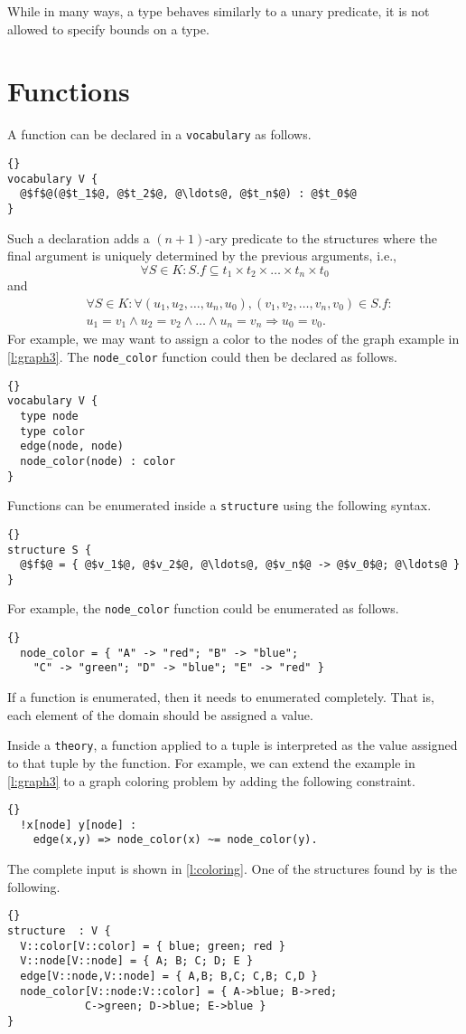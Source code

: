 \documentclass{article}
\begin{document}
While in many ways, a type behaves similarly to a unary predicate,
it is not allowed to specify bounds on a type.

\section{Functions}

A function can be declared in a \texttt{vocabulary} as follows.
\begin{lstlisting}[escapechar=@]{}
vocabulary V {
  @$f$@(@$t_1$@, @$t_2$@, @\ldots@, @$t_n$@) : @$t_0$@
}
\end{lstlisting}
Such a declaration adds a $(n+1)$-ary predicate to the structures
where the final argument is uniquely determined by the previous arguments,
i.e.,
$$
\forall S \in K : S.f \subseteq
	t_1 \times t_2 \times \ldots \times t_n \times t_0
$$
and
$$
\begin{aligned}
& \forall S \in K :
	\forall (u_1, u_2, \ldots, u_n, u_0),
	(v_1, v_2, \ldots, v_n, v_0) \in S.f: \\
&	u_1 = v_1 \wedge u_2 = v_2 \wedge \ldots \wedge u_n = v_n
	\Rightarrow u_0 = v_0
.
\end{aligned}
$$
For example, we may want to assign a color to the nodes
of the graph example in \autoref{l:graph3}.  The \texttt{node\_color}
function could then be declared as follows.
\begin{lstlisting}{}
vocabulary V {
  type node
  type color
  edge(node, node)
  node_color(node) : color
}
\end{lstlisting}

Functions can be enumerated inside a \texttt{structure} using the following
syntax.
\begin{lstlisting}[escapechar=@]{}
structure S {
  @$f$@ = { @$v_1$@, @$v_2$@, @\ldots@, @$v_n$@ -> @$v_0$@; @\ldots@ }
}
\end{lstlisting}
For example, the \texttt{node\_color} function could be enumerated as follows.
\begin{lstlisting}{}
  node_color = { "A" -> "red"; "B" -> "blue";
	"C" -> "green"; "D" -> "blue"; "E" -> "red" }
\end{lstlisting}
If a function is enumerated, then it needs to enumerated completely.
That is, each element of the domain should be assigned a value.

Inside a \texttt{theory}, a function applied to a tuple is interpreted
as the value assigned to that tuple by the function.
For example, we can extend the example in \autoref{l:graph3} to
a graph coloring problem by adding the following constraint.
\begin{lstlisting}{}
  !x[node] y[node] :
    edge(x,y) => node_color(x) ~= node_color(y).
\end{lstlisting}
The complete input is shown in \autoref{l:coloring}.
One of the structures found by \idp is the following.
\begin{lstlisting}{}
structure  : V {
  V::color[V::color] = { blue; green; red }
  V::node[V::node] = { A; B; C; D; E }
  edge[V::node,V::node] = { A,B; B,C; C,B; C,D }
  node_color[V::node:V::color] = { A->blue; B->red;
			C->green; D->blue; E->blue }
}
\end{lstlisting}
\end{document}
